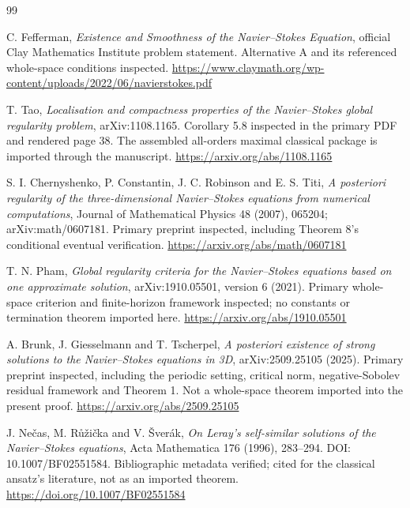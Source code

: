 \documentclass[11pt,a4paper]{article}
\theoremstyle{definition}\newtheorem{definition}[theorem]{Definition}
\theoremstyle{remark}\newtheorem{remark}[theorem]{Remark}
\numberwithin{equation}{section}
\begin{document}
\begin{thebibliography}{99}
 C. Fefferman, \emph{Existence and Smoothness of the Navier--Stokes Equation}, official Clay Mathematics Institute problem statement. Alternative A and its referenced whole-space conditions inspected.\newline
\url{https://www.claymath.org/wp-content/uploads/2022/06/navierstokes.pdf}

 T. Tao, \emph{Localisation and compactness properties of the Navier--Stokes global regularity problem}, arXiv:1108.1165. Corollary 5.8 inspected in the primary PDF and rendered page 38. The assembled all-orders maximal classical package is imported through the manuscript.\newline
\url{https://arxiv.org/abs/1108.1165}

 S. I. Chernyshenko, P. Constantin, J. C. Robinson and E. S. Titi, \emph{A posteriori regularity of the three-dimensional Navier--Stokes equations from numerical computations}, Journal of Mathematical Physics 48 (2007), 065204; arXiv:math/0607181. Primary preprint inspected, including Theorem 8's conditional eventual verification.\newline
\url{https://arxiv.org/abs/math/0607181}

 T. N. Pham, \emph{Global regularity criteria for the Navier--Stokes equations based on one approximate solution}, arXiv:1910.05501, version 6 (2021). Primary whole-space criterion and finite-horizon framework inspected; no constants or termination theorem imported here.\newline
\url{https://arxiv.org/abs/1910.05501}

 A. Brunk, J. Giesselmann and T. Tscherpel, \emph{A posteriori existence of strong solutions to the Navier--Stokes equations in 3D}, arXiv:2509.25105 (2025). Primary preprint inspected, including the periodic setting, critical norm, negative-Sobolev residual framework and Theorem 1. Not a whole-space theorem imported into the present proof.\newline
\url{https://arxiv.org/abs/2509.25105}

 J. Ne\v cas, M. R\r u\v zi\v cka and V. \v Sver\'ak, \emph{On Leray's self-similar solutions of the Navier--Stokes equations}, Acta Mathematica 176 (1996), 283--294. DOI: 10.1007/BF02551584. Bibliographic metadata verified; cited for the classical ansatz's literature, not as an imported theorem.\newline
\url{https://doi.org/10.1007/BF02551584}


\end{thebibliography}
\end{document}
